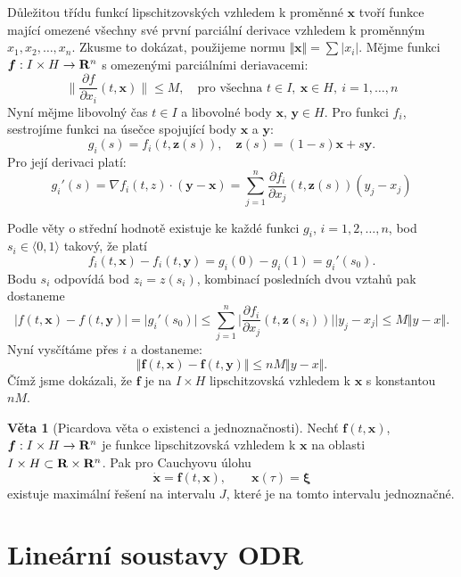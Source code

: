 \documentclass[a4paper, 12pt]{book}
\theoremstyle{definition}
\newtheorem{theorem}{Věta}[section]
\def\grad{\nabla}
\def\to{\rightarrow}
\def\Real{{\rm\bf R}}
\def\vc#1{\mathbf{\boldsymbol{#1}}}     %
\def\abs#1{\lvert#1\rvert}
\def\norm#1{\bigl\Vert#1\bigr\Vert} %
\def\prtl{\partial}                                        %
\begin{document}
Důležitou třídu funkcí lipschitzovských vzhledem k proměnné $\vc x$ 
tvoří funkce mající omezené všechny své první parciální derivace vzhledem k proměnným 
$x_1, x_2, \dots, x_n$. Zkusme to dokázat, použijeme normu $\norm{\vc x} = \sum \abs{x_i}$. Mějme funkci $\vc f: I \times H \to \Real^n$
s omezenými parciálními deriavacemi:
\[
    \Big\| \frac{\prtl f}{\prtl x_i}(t, \vc x) \Big\| \le M, \quad \text{pro všechna } t\in I,\ \vc x \in H,\ i=1,\dots, n
\]
Nyní mějme libovolný čas $t\in I$ a libovolné body $\vc x,\, \vc y\in H$. Pro funkci $f_i$, sestrojíme funkci 
na úsečce spojující body $\vc x$ a $\vc y$:
\[
   g_i(s) = f_i(t, \vc z(s)),\quad \vc z(s) = (1-s) \vc x + s \vc y.
\]
Pro její derivaci platí:
\[
  g_i'(s) = \grad f_i(t, z) \cdot (\vc y - \vc x) = \sum_{j=1}^{n} \frac{\prtl f_i}{\prtl x_j}(t, \vc z(s)) (y_j - x_j)
\]


Podle věty o střední hodnotě existuje ke každé funkci $g_i$, $i=1,2,\dots,n$,
bod $s_i\in \langle 0, 1\rangle$ takový, že platí
\[
    f_i(t, \vc x)-f_i(t, \vc y)= g_i(0) - g_i(1) = g_i'(s_0).
\]
Bodu $s_i$ odpovídá bod $z_i = z(s_i)$, kombinací posledních dvou vztahů pak dostaneme
\[
  \abs{f(t, \vc x)-f(t, \vc y)} = \abs{g_i'(s_0)} \le \sum_{j=1}^{n} \Big | \frac{\prtl f_i}{\prtl x_j}(t, \vc z(s_i)) \Big | \abs{y_j - x_j} \le M\norm{y - x}.
\]
Nyní vysčítáme přes  $i$ a dostaneme:
\[
  \norm{ \vc f(t, \vc x) - \vc f(t,\vc y) } \le nM \norm{y-x}.
\]
Čímž jsme dokázali, že $\vc f$ je na $I\times H$ lipschitzovská vzhledem k $\vc x$ s konstantou $nM$.




\begin{theorem}[Picardova věta o existenci a jednoznačnosti]
\label{thm::Picard}
Nechť $\vc f(t, \vc x)$, $\vc f: I\times H \to \Real^n$ je funkce lipschitzovská vzhledem k $\vc x$
na oblasti $I\times H \subset \Real \times \Real ^n$. Pak pro Cauchyovu úlohu
\begin{equation}
 \dot{\vc x}=\vc f(t,\vc x),\qquad \vc x(\tau)=\vc \xi
\end{equation}
existuje maximální řešení na intervalu $J$, které je na tomto intervalu jednoznačné.
\end{theorem}





\section{Lineární soustavy ODR}
\label{linearni_soustavy}
\end{document}

